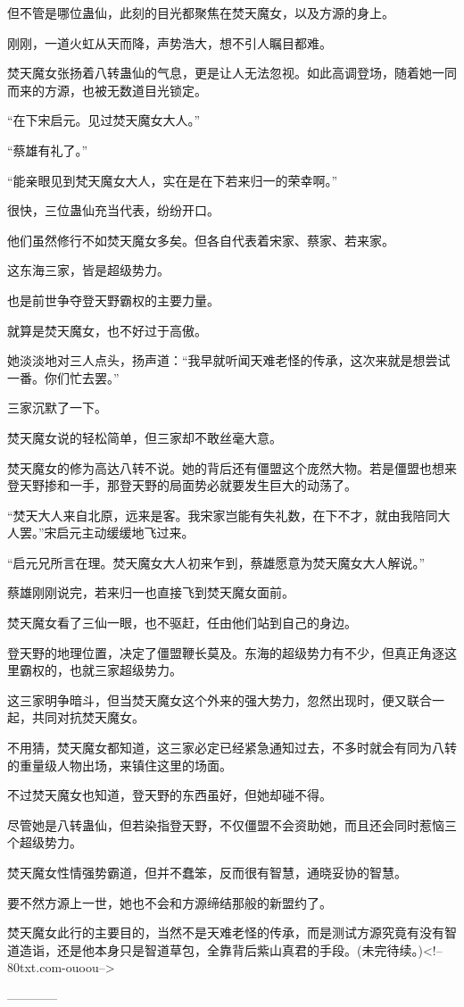\begin{this_body}
但不管是哪位蛊仙，此刻的目光都聚焦在焚天魔女，以及方源的身上。

刚刚，一道火虹从天而降，声势浩大，想不引人瞩目都难。

焚天魔女张扬着八转蛊仙的气息，更是让人无法忽视。如此高调登场，随着她一同而来的方源，也被无数道目光锁定。

“在下宋启元。见过焚天魔女大人。”

“蔡雄有礼了。”

“能亲眼见到梵天魔女大人，实在是在下若来归一的荣幸啊。”

很快，三位蛊仙充当代表，纷纷开口。

他们虽然修行不如焚天魔女多矣。但各自代表着宋家、蔡家、若来家。

这东海三家，皆是超级势力。

也是前世争夺登天野霸权的主要力量。

就算是焚天魔女，也不好过于高傲。

她淡淡地对三人点头，扬声道：“我早就听闻天难老怪的传承，这次来就是想尝试一番。你们忙去罢。”

三家沉默了一下。

焚天魔女说的轻松简单，但三家却不敢丝毫大意。

焚天魔女的修为高达八转不说。她的背后还有僵盟这个庞然大物。若是僵盟也想来登天野掺和一手，那登天野的局面势必就要发生巨大的动荡了。

“焚天大人来自北原，远来是客。我宋家岂能有失礼数，在下不才，就由我陪同大人罢。”宋启元主动缓缓地飞过来。

“启元兄所言在理。焚天魔女大人初来乍到，蔡雄愿意为焚天魔女大人解说。”

蔡雄刚刚说完，若来归一也直接飞到焚天魔女面前。

焚天魔女看了三仙一眼，也不驱赶，任由他们站到自己的身边。

登天野的地理位置，决定了僵盟鞭长莫及。东海的超级势力有不少，但真正角逐这里霸权的，也就三家超级势力。

这三家明争暗斗，但当焚天魔女这个外来的强大势力，忽然出现时，便又联合一起，共同对抗焚天魔女。

不用猜，焚天魔女都知道，这三家必定已经紧急通知过去，不多时就会有同为八转的重量级人物出场，来镇住这里的场面。

不过焚天魔女也知道，登天野的东西虽好，但她却碰不得。

尽管她是八转蛊仙，但若染指登天野，不仅僵盟不会资助她，而且还会同时惹恼三个超级势力。

焚天魔女性情强势霸道，但并不蠢笨，反而很有智慧，通晓妥协的智慧。

要不然方源上一世，她也不会和方源缔结那般的新盟约了。

焚天魔女此行的主要目的，当然不是天难老怪的传承，而是测试方源究竟有没有智道造诣，还是他本身只是智道草包，全靠背后紫山真君的手段。(未完待续。)<!--80txt.com-ouoou-->

------------

\end{this_body}


